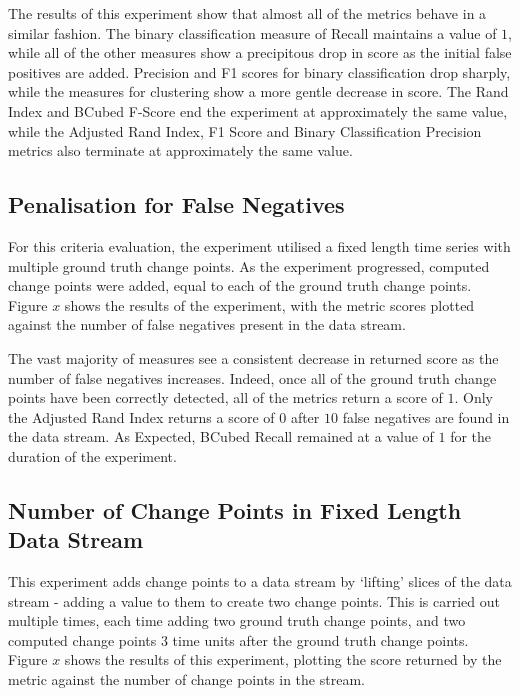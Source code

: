 \documentclass{uvamscse}	%
\begin{document}

The results of this experiment show that almost all of the metrics behave in a similar fashion. The binary classification measure of Recall maintains a value of $1$, while all of the other measures  show a precipitous drop in score as the initial false positives are added. Precision and F1 scores for binary classification drop sharply, while the measures for clustering show a more gentle decrease in score. The Rand Index and BCubed F-Score end the experiment at approximately the same value, while the Adjusted Rand Index, F1 Score and Binary Classification Precision metrics also terminate at approximately the same value.

\subsection{Penalisation for False Negatives}

For this criteria evaluation, the experiment utilised a fixed length time series with multiple ground truth change points. As the experiment progressed, computed change points were added, equal to each of the ground truth change points. Figure $x$ shows the results of the experiment, with the metric scores plotted against the number of false negatives present in the data stream.


The vast majority of measures see a consistent decrease in returned score as the number of false negatives increases. Indeed, once all of the ground truth change points have been correctly detected, all of the metrics return a score of $1$. Only the Adjusted Rand Index returns a score of $0$ after $10$ false negatives are found in the data stream. As Expected, BCubed Recall remained at a value of $1$ for the duration of the experiment.

\subsection{Number of Change Points in Fixed Length Data Stream}

This experiment adds change points to a data stream by `lifting' slices of the data stream - adding a value to them to create two change points. This is carried out multiple times, each time adding two ground truth change points, and two computed change points 3 time units after the ground truth change points. Figure $x$ shows the results of this experiment, plotting the score returned by the metric against the number of change points in the stream.
\end{document}
